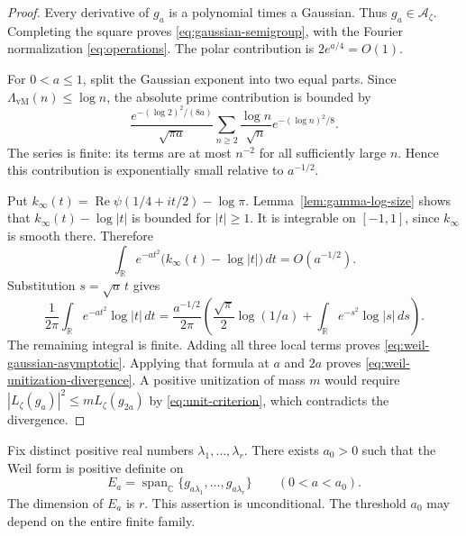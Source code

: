 \documentclass[11pt]{article}
\numberwithin{equation}{section}
\newcommand{\cA}{\mathcal A}
\newcommand{\R}{\mathbb R}
\newcommand{\C}{\mathbb C}
\begin{document}
\begin{proof}
Every derivative of $g_a$ is a polynomial times a Gaussian.
Thus $g_a\in\cA_\zeta$.  Completing the square proves
\eqref{eq:gaussian-semigroup}, with the Fourier normalization
\eqref{eq:operations}.
The polar contribution is $2e^{a/4}=O(1)$.

For $0<a\leq1$, split the Gaussian exponent into two equal parts.
Since $\Lambda_{\mathrm{vM}}(n)\leq\log n$, the absolute prime contribution
is bounded by
\begin{equation}
 \frac{e^{-(\log2)^2/(8a)}}{\sqrt{\pi a}}
 \sum_{n\geq2}\frac{\log n}{\sqrt n}
                       e^{-(\log n)^2/8}.
 \label{eq:prime-gaussian-bound}
\end{equation}
The series is finite: its terms are at most $n^{-2}$ for all sufficiently
large $n$.  Hence this contribution is exponentially small relative to
$a^{-1/2}$.

Put $k_\infty(t)=\operatorname{Re}\psi(1/4+it/2)-\log\pi$.
Lemma~\ref{lem:gamma-log-size} shows that
$k_\infty(t)-\log|t|$ is bounded for $|t|\geq1$.
It is integrable on $[-1,1]$, since $k_\infty$ is smooth there.
Therefore
\[
 \int_{\R}e^{-at^2}\bigl(k_\infty(t)-\log|t|\bigr)\,dt
 =O(a^{-1/2}).
\]
Substitution $s=\sqrt a\,t$ gives
\[
 \frac1{2\pi}\int_{\R}e^{-at^2}\log|t|\,dt
 =\frac{a^{-1/2}}{2\pi}
 \left(\frac{\sqrt\pi}{2}\log(1/a)
          +\int_{\R}e^{-s^2}\log|s|\,ds\right).
\]
The remaining integral is finite.  Adding all three local terms proves
\eqref{eq:weil-gaussian-asymptotic}.
Applying that formula at $a$ and $2a$ proves
\eqref{eq:weil-unitization-divergence}.
A positive unitization of mass $m$ would require
$|L_\zeta(g_a)|^2\leq mL_\zeta(g_{2a})$ by
\eqref{eq:unit-criterion}, which contradicts the divergence.
\end{proof}

\begin{theorem}
\label{thm:gaussian-subspaces}
Fix distinct positive real numbers $\lambda_1,\ldots,\lambda_r$.
There exists $a_0>0$ such that the Weil form is positive definite on
\[
 E_a=\operatorname{span}_{\C}\{g_{a\lambda_1},\ldots,g_{a\lambda_r}\}
 \qquad(0<a<a_0).
\]
The dimension of $E_a$ is $r$.  This assertion is unconditional.
The threshold $a_0$ may depend on the entire finite family.
\end{theorem}
\end{document}
